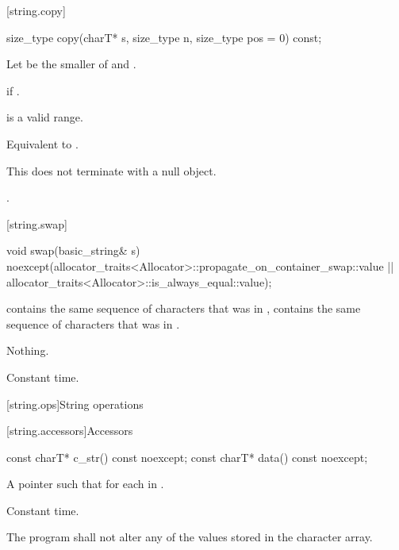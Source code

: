 [string.copy]{}

%
\begin{itemdecl}
size_type copy(charT* s, size_type n, size_type pos = 0) const;
\end{itemdecl}

\begin{itemdescr}
\pnum
Let  be the smaller of  and .

\pnum
\throws
{}
if
.

\pnum
\requires
{} is a valid range.

\pnum
\effects
Equivalent to .
\begin{note} This does not terminate  with a null object. \end{note}

\pnum
\returns
{}.
\end{itemdescr}

[string.swap]{}

%
\begin{itemdecl}
void swap(basic_string& s)
  noexcept(allocator_traits<Allocator>::propagate_on_container_swap::value ||
           allocator_traits<Allocator>::is_always_equal::value);
\end{itemdecl}

\begin{itemdescr}
\pnum
\postconditions
{}
contains the same sequence of characters that was in ,
 contains the same sequence of characters that was in
.

\pnum
\throws Nothing.

\pnum
\complexity Constant time.
\end{itemdescr}

[string.ops]{String operations}

[string.accessors]{Accessors}

%
%
\begin{itemdecl}
const charT* c_str() const noexcept;
const charT* data() const noexcept;
\end{itemdecl}

\begin{itemdescr}
\pnum
\returns A pointer  such that  for each
 in .

\pnum
\complexity Constant time.

\pnum
\requires
The program shall not alter any of the values stored in the character array.
\end{itemdescr}


